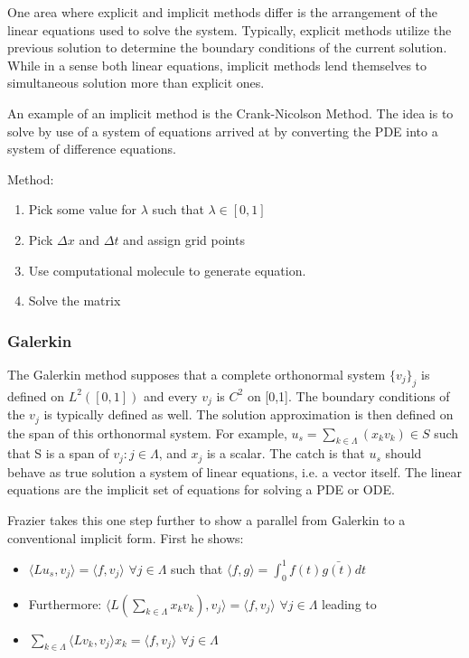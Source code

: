 \documentclass[11pt]{article}
\begin{document}
One area where explicit and implicit methods differ is the arrangement of the linear equations used to solve the system.  Typically, explicit methods utilize the previous solution to determine the boundary conditions of the current solution.   While in a sense both linear equations, implicit methods lend themselves to simultaneous solution more than explicit ones.  

An example of an implicit method is the Crank-Nicolson Method.  The idea is to solve by use of a system of equations arrived at by converting the PDE into a system of difference equations.   

Method:  
\begin{enumerate}
\item Pick some value for $\lambda$ such that $\lambda \in [0,1] $
\item Pick $\Delta x$ and $\Delta t$ and assign grid points
\item Use computational molecule to generate equation.
\item Solve the matrix
\end{enumerate}

\subsubsection {Galerkin}
The Galerkin method supposes that a complete orthonormal system $\{v_j\}_j$ is defined on $L^2([0,1])$ and every $v_j$ is $C^2$ on [0,1].  The boundary conditions of the $v_j$ is typically defined as well.  The solution approximation is then defined on the span of this orthonormal system.  For example,
$u_s = \sum_{k\in \Lambda} (x_k v_k )\in S$ such that S is a span of $v_j : j\in \Lambda$, and $x_j$ is a scalar.  The catch is that $u_s$ should behave as true solution a system of linear equations, i.e. a vector itself.   The linear equations are %
the implicit set of equations for solving a PDE or ODE.  

Frazier takes this one step further to show a parallel from Galerkin to a conventional implicit form.  First he shows:
\begin{itemize}
\item $\langle L u_s, v_j \rangle = \langle f, v_j \rangle$ $\forall j\in \Lambda$ such that $\langle f, g \rangle = \int ^1 _0 f(t) \bar{g(t)} dt $ 
\item Furthermore: $\langle L (\sum_{k\in \Lambda} x_k v_k), v_j \rangle = \langle f, v_j \rangle$ $\forall j\in \Lambda$ leading to
\item $\sum_{k\in \Lambda} \langle L v_k , v_j \rangle x_k = \langle f, v_j \rangle$ $\forall j\in \Lambda$ 
\end{itemize}
\end{document}

